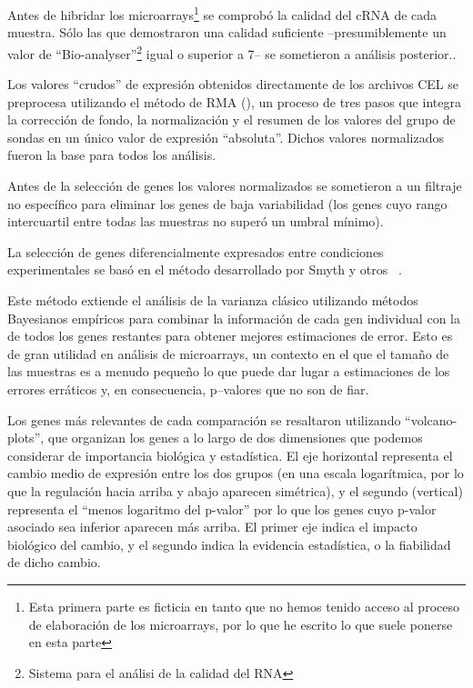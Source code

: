 \documentclass[a4paper]{article}\usepackage[]{graphicx}\usepackage[]{color}
\begin{document}
Antes de hibridar los microarrays\footnote{Esta primera parte es ficticia en tanto que no hemos tenido acceso al proceso de elaboración de los microarrays, por lo que he escrito lo que suele ponerse en esta parte} se comprobó la calidad del cRNA de cada muestra. Sólo las que demostraron una calidad suficiente --presumiblemente un valor de ``Bio-analyser''\footnote{Sistema para el análisi de la calidad del RNA} igual o superior a 7-- se sometieron a análisis posterior.. 

Los valores ``crudos'' de expresión obtenidos directamente de los archivos CEL se preprocesa utilizando el método de RMA (\cite{Irizarry:2003}), un proceso de tres pasos que integra la corrección de fondo, la normalización y el resumen de los valores del grupo de sondas en un único valor de expresión ``absoluta''. Dichos valores normalizados fueron la base para todos los análisis.

Antes de la selección de genes los valores normalizados se sometieron a un filtraje no específico para eliminar los genes de baja 
variabilidad (los genes cuyo rango intercuartil entre todas las muestras no superó un umbral mínimo).

La selección de genes diferencialmente expresados entre condiciones experimentales se basó en el método desarrollado por Smyth y otros ~\cite{Smyth:2004}.


Este método extiende el análisis de la varianza clásico utilizando métodos Bayesianos empíricos para combinar la información de cada gen individual con la de todos los genes restantes para obtener mejores estimaciones de error. Esto es de gran utilidad en análisis de microarrays, un contexto en el que el tamaño de las muestras es a menudo pequeño lo que puede dar lugar a estimaciones de los errores erráticos y, en consecuencia, p--valores que no son de fiar.

Los genes más relevantes de cada comparaci\'on se resaltaron utilizando ``volcano-plots'', 
que organizan los genes a lo largo de dos dimensiones que podemos considerar de importancia biológica y estadística. El eje horizontal representa el cambio medio de expresión entre los dos grupos (en una escala logarítmica, por lo que la regulación hacia arriba y abajo aparecen simétrica), y el segundo (vertical) representa el ``menos logaritmo del p-valor'' por lo que los genes cuyo p-valor asociado sea inferior aparecen más arriba. El primer eje indica el impacto biológico del cambio, y el segundo indica la evidencia estadística, o la fiabilidad de dicho cambio.
\end{document}
